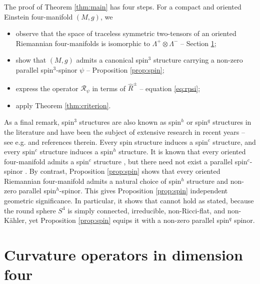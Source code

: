 \documentclass[oneside,12pt]{amsart}
\theoremstyle{definition}
\numberwithin{equation}{section}
\begin{document}
The proof of Theorem \ref{thm:main} has four steps. For a compact and oriented Einstein four-manifold $(M,g)$, we 
\begin{itemize}
\item observe that the space of traceless symmetric two-tensors of an oriented Riemannian four-manifolds is isomorphic to $\Lambda^+ \otimes \Lambda^-$ -- Section \ref{sec:curvature}; 
\item show that $(M,g)$ admits a canonical spin$^3$ structure carrying a non-zero parallel spin$^3$-spinor $\psi$ -- Proposition \ref{prop:spin}; 
\item express the operator $\mathcal{R}_{\psi}$ in terms of $\widehat{R}^{\pm}$ -- equation \eqref{eq:rpsi}; 
\item apply Theorem \ref{thm:criterion}. 
\end{itemize}

As a final remark, spin$^3$ structures are also known as spin$^h$ or spin$^q$ structures in the literature and have been the subject of extensive research in recent years -- see e.g. \cite{L23} and references therein. Every spin structure induces a spin$^c$ structure, and every spin$^c$ structure induces a spin$^h$ structure. It is known that every oriented four-manifold admits a spin$^c$ structure \cite{HH,TV05}, but there need not exist a parallel spin$^c$-spinor \cite{M97}. By contrast, Proposition \ref{prop:spin} shows that every oriented Riemannian four-manifold admits a natural choice of spin$^h$ structure and non-zero parallel spin$^h$-spinor. This gives Proposition \ref{prop:spin} independent geometric significance. In particular, it shows that \cite[Thm. 3.1]{HH07} cannot hold as stated, because the round sphere $S^4$ is simply connected, irreducible, non-Ricci-flat, and non-K{\"a}hler, yet Proposition \ref{prop:spin} equips it with a non-zero parallel spin$^q$ spinor. 


\section{Curvature operators in dimension four} \label{sec:curvature}
\end{document}
